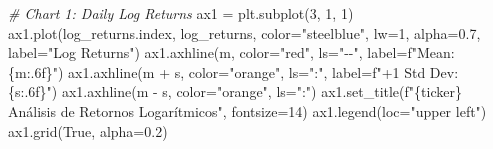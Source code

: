 \documentclass[
  11pt,
]{article}
\newenvironment{Shaded}{}{}
\newcommand{\CommentTok}[1]{\textcolor[rgb]{0.38,0.63,0.69}{\textit{#1}}}
\newcommand{\DecValTok}[1]{\textcolor[rgb]{0.25,0.63,0.44}{#1}}
\newcommand{\FloatTok}[1]{\textcolor[rgb]{0.25,0.63,0.44}{#1}}
\newcommand{\NormalTok}[1]{#1}
\newcommand{\OperatorTok}[1]{\textcolor[rgb]{0.40,0.40,0.40}{#1}}
\newcommand{\SpecialCharTok}[1]{\textcolor[rgb]{0.25,0.44,0.63}{#1}}
\newcommand{\SpecialStringTok}[1]{\textcolor[rgb]{0.73,0.40,0.53}{#1}}
\newcommand{\StringTok}[1]{\textcolor[rgb]{0.25,0.44,0.63}{#1}}
\newcommand{\VariableTok}[1]{\textcolor[rgb]{0.10,0.09,0.49}{#1}}
\begin{document}
\begin{Shaded}
\begin{Highlighting}[]
\CommentTok{\# Chart 1: Daily Log Returns}
\NormalTok{ax1 }\OperatorTok{=}\NormalTok{ plt.subplot(}\DecValTok{3}\NormalTok{, }\DecValTok{1}\NormalTok{, }\DecValTok{1}\NormalTok{)}
\NormalTok{ax1.plot(log\_returns.index, log\_returns, color}\OperatorTok{=}\StringTok{"steelblue"}\NormalTok{, lw}\OperatorTok{=}\DecValTok{1}\NormalTok{, alpha}\OperatorTok{=}\FloatTok{0.7}\NormalTok{, label}\OperatorTok{=}\StringTok{"Log Returns"}\NormalTok{)}
\NormalTok{ax1.axhline(m, color}\OperatorTok{=}\StringTok{"red"}\NormalTok{, ls}\OperatorTok{=}\StringTok{"{-}{-}"}\NormalTok{, label}\OperatorTok{=}\SpecialStringTok{f"Mean: }\SpecialCharTok{\{}\NormalTok{m}\SpecialCharTok{:.6f\}}\SpecialStringTok{"}\NormalTok{)}
\NormalTok{ax1.axhline(m }\OperatorTok{+}\NormalTok{ s, color}\OperatorTok{=}\StringTok{"orange"}\NormalTok{, ls}\OperatorTok{=}\StringTok{":"}\NormalTok{, label}\OperatorTok{=}\SpecialStringTok{f"+1 Std Dev: }\SpecialCharTok{\{}\NormalTok{s}\SpecialCharTok{:.6f\}}\SpecialStringTok{"}\NormalTok{)}
\NormalTok{ax1.axhline(m }\OperatorTok{{-}}\NormalTok{ s, color}\OperatorTok{=}\StringTok{"orange"}\NormalTok{, ls}\OperatorTok{=}\StringTok{":"}\NormalTok{)}
\NormalTok{ax1.set\_title(}\SpecialStringTok{f"}\SpecialCharTok{\{}\NormalTok{ticker}\SpecialCharTok{\}}\SpecialStringTok{ Análisis de Retornos Logarítmicos"}\NormalTok{, fontsize}\OperatorTok{=}\DecValTok{14}\NormalTok{)}
\NormalTok{ax1.legend(loc}\OperatorTok{=}\StringTok{"upper left"}\NormalTok{)}
\NormalTok{ax1.grid(}\VariableTok{True}\NormalTok{, alpha}\OperatorTok{=}\FloatTok{0.2}\NormalTok{)}


\end{Highlighting}
\end{Shaded}
\end{document}
